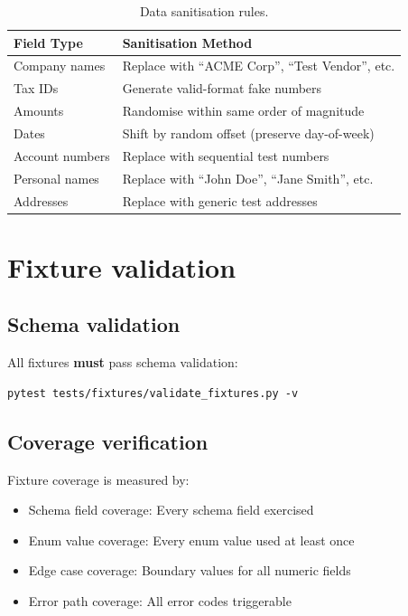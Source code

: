 \documentclass[12pt,a4paper,twoside]{report}
\begin{document}
\begin{table}[htbp]
\centering
\caption{Data sanitisation rules.}
\label{tab:sanitisation}
\footnotesize
\begin{tabularx}{\linewidth}{@{}l X@{}}
\toprule
\textbf{Field Type} & \textbf{Sanitisation Method} \\ \midrule
Company names & Replace with ``ACME Corp'', ``Test Vendor'', etc. \\
Tax IDs & Generate valid-format fake numbers \\
Amounts & Randomise within same order of magnitude \\
Dates & Shift by random offset (preserve day-of-week) \\
Account numbers & Replace with sequential test numbers \\
Personal names & Replace with ``John Doe'', ``Jane Smith'', etc. \\
Addresses & Replace with generic test addresses \\
\bottomrule
\end{tabularx}
\end{table}

\section{Fixture validation}

\subsection{Schema validation}

All fixtures \textbf{must} pass schema validation:

\begin{lstlisting}[basicstyle=\ttfamily\small]
pytest tests/fixtures/validate_fixtures.py -v
\end{lstlisting}

\subsection{Coverage verification}

Fixture coverage is measured by:
\begin{itemize}
\item Schema field coverage: Every schema field exercised
\item Enum value coverage: Every enum value used at least once
\item Edge case coverage: Boundary values for all numeric fields
\item Error path coverage: All error codes triggerable
\end{itemize}
\end{document}
